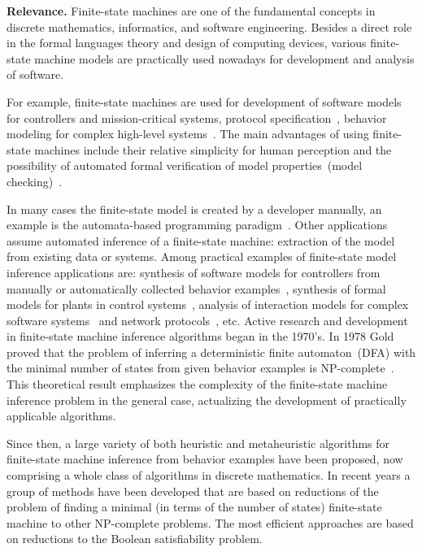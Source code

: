 
\textbf{Relevance.}
Finite-state machines are one of the fundamental concepts in discrete mathematics, informatics, and software engineering.
Besides a direct role in the formal languages theory and design of computing devices, various finite-state machine models are practically used nowadays for
development and analysis of software.

For example, finite-state machines are used for development of software models for controllers and mission-critical systems\cite{shalyto-automata-2010-en,DBLP:conf/setta/PatilDV15},
protocol specification~\cite{DBLP:conf/coordination/JongmansHA14}, behavior modeling for complex high-level systems~\cite{DBLP:journals/ese/HeuleV13,wagner2006modeling}.
The main advantages of using finite-state machines include their relative simplicity for human perception and the possibility of automated formal verification of model properties~(model checking)~\cite{clarke2018model}.

In many cases the finite-state model is created by a developer manually, an example is the automata-based programming paradigm~\cite{shalyto-automata-2010-en}.
Other applications assume automated inference of a finite-state machine: extraction of the model from existing data or systems.
Among practical examples of finite-state model inference applications are:
synthesis of software models for controllers from manually or automatically collected behavior examples~\cite{DBLP:conf/etfa/ChivilikhinBUSS18}, 
synthesis of formal models for plants in control systems~\cite{DBLP:conf/etfa/BuzhinskyV17,DBLP:journals/tii/BuzhinskyV17}, 
analysis of interaction models for complex software systems~\cite{DBLP:journals/tosem/CookW98,DBLP:conf/sigsoft/BertolinoIPT09,DBLP:journals/ese/HeuleV13}  and network protocols~\cite{DBLP:conf/sp/SivakornAPKJ17}, etc.
Active research and development in finite-state machine inference algorithms began in the 1970's.
In 1978 Gold proved that the problem of inferring a deterministic finite automaton~(DFA) with the minimal number of states from given behavior examples is NP-complete~\cite{DBLP:journals/iandc/Gold78}.
This theoretical result emphasizes the complexity of the finite-state machine inference problem in the general case, actualizing the development of practically applicable algorithms.

Since then, a large variety of both heuristic and metaheuristic algorithms for finite-state machine inference from behavior examples have been proposed,
now comprising a whole class of algorithms in discrete mathematics.
In recent years a group of methods have been developed that are based on reductions of the problem of finding a minimal (in terms of the number of states) finite-state machine to other NP-complete problems.
The most efficient approaches are based on reductions to the Boolean satisfiability problem.

